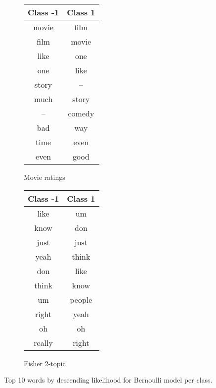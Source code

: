 \documentclass[10pt,a4paper]{article}
\begin{document}
\begin{figure}[H]
\centering
\begin{subfigure}{0.3\textwidth}
\begin{tabular}{|c|c|}
\hline
Class -1 & Class 1 \\
\hline
movie & film \\
film & movie \\
like & one \\
one & like \\
story & -- \\
much & story \\
-- & comedy \\
bad & way \\
time & even \\
even & good \\
\hline
\end{tabular}
\caption{Movie ratings}
\end{subfigure}%
\begin{subfigure}{0.3\textwidth}
\begin{tabular}{|c|c|}
\hline
Class -1 & Class 1 \\
\hline
like & um \\
know & don \\
just & just \\
yeah & think \\
don & like \\
think & know \\
um & people \\
right & yeah \\
oh & oh \\
really & right \\
\hline
\end{tabular}
\caption{Fisher 2-topic}
\end{subfigure}
\caption{Top 10 words by descending likelihood for Bernoulli model per class.}
\end{figure}
\end{document}
